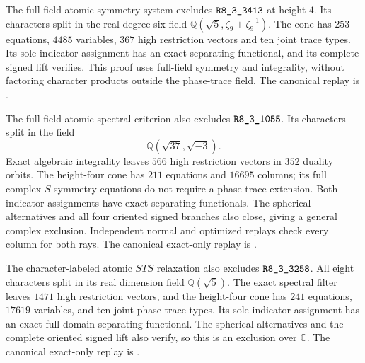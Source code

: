 The full-field atomic symmetry system excludes $\sha{R8_3_3413}$ at
height $4$. Its characters split in the real degree-six field
$\mathbb Q(\sqrt5,\zeta_9+\zeta_9^{-1})$. The cone has $253$ equations,
$4485$ variables, $367$ high restriction vectors and ten joint trace
types. Its sole indicator assignment has an exact separating
functional, and its complete signed lift verifies. This proof uses
full-field symmetry and integrality, without factoring character
products outside the phase-trace field. The canonical replay is
.

The full-field atomic spectral criterion also excludes $\sha{R8_3_1055}$.
Its characters split in the field
\[
  \mathbb Q(\sqrt{37},\sqrt{-3}).
\]
Exact algebraic integrality leaves
$566$ high restriction vectors in $352$ duality orbits. The
height-four cone has $211$ equations and $16695$ columns; its full
complex $S$-symmetry equations do not require a phase-trace extension.
Both indicator assignments have exact separating functionals.
The spherical alternatives and all four oriented signed branches
also close, giving a general complex exclusion. Independent normal
and optimized replays check every column for both rays.
The canonical exact-only replay is
.

The character-labeled atomic $STS$ relaxation also excludes
$\sha{R8_3_3258}$. All eight characters split in its real dimension field
$\mathbb Q(\sqrt5)$. The exact spectral filter leaves $1471$ high
restriction vectors, and the height-four cone has $241$ equations,
$17619$ variables, and ten joint phase-trace types. Its sole indicator
assignment has an exact full-domain separating functional. The
spherical alternatives and the complete oriented signed lift also
verify, so this is an exclusion over $\mathbb C$.
The canonical exact-only replay is
.
